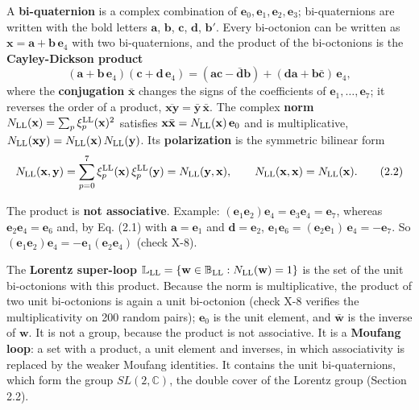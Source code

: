 \documentclass[
  10pt,
]{article}
\begin{document}
A \textbf{bi-quaternion} is a complex combination of
\(\mathbf e_0,\mathbf e_1,\mathbf e_2,\mathbf e_3\); bi-quaternions are
written with the bold letters \(\mathbf a\), \(\mathbf b\),
\(\mathbf c\), \(\mathbf d\), \(\mathbf b'\). Every bi-octonion can be
written as \(\mathbf x=\mathbf a+\mathbf b\,\mathbf e_4\) with two
bi-quaternions, and the product of the bi-octonions is the
\textbf{Cayley-Dickson product}
\[(\mathbf a+\mathbf b\,\mathbf e_4)(\mathbf c+\mathbf d\,\mathbf e_4)=(\mathbf a\mathbf c-\bar{\mathbf d}\mathbf b)+(\mathbf d\mathbf a+\mathbf b\bar{\mathbf c})\,\mathbf e_4 , \tag{2.1}\]
where the \textbf{conjugation} \(\bar{\mathbf x}\) changes the signs of
the coefficients of \(\mathbf e_1,\dots,\mathbf e_7\); it reverses the
order of a product,
\(\overline{\mathbf x\mathbf y}=\bar{\mathbf y}\,\bar{\mathbf x}\). The
complex \textbf{norm}
\(N_{\rm LL}(\mathbf x)=\sum_p\xi^{\rm LL}_p(\mathbf x)^2\) satisfies
\(\mathbf x\bar{\mathbf x}=N_{\rm LL}(\mathbf x)\,\mathbf e_0\) and is
multiplicative,
\(N_{\rm LL}(\mathbf x\mathbf y)=N_{\rm LL}(\mathbf x)\,N_{\rm LL}(\mathbf y)\).
Its \textbf{polarization} is the symmetric bilinear form
\[N_{\rm LL}(\mathbf x,\mathbf y)=\sum_{p=0}^7\xi^{\rm LL}_p(\mathbf x)\,\xi^{\rm LL}_p(\mathbf y)=N_{\rm LL}(\mathbf y,\mathbf x),\qquad N_{\rm LL}(\mathbf x,\mathbf x)=N_{\rm LL}(\mathbf x). \tag{2.2}\]

The product is \textbf{not associative}. Example:
\((\mathbf e_1\mathbf e_2)\mathbf e_4=\mathbf e_3\mathbf e_4=\mathbf e_7\),
whereas \(\mathbf e_2\mathbf e_4=\mathbf e_6\) and, by Eq. (2.1) with
\(\mathbf a=\mathbf e_1\) and \(\mathbf d=\mathbf e_2\),
\(\mathbf e_1\mathbf e_6=(\mathbf e_2\mathbf e_1)\,\mathbf e_4=-\mathbf e_7\).
So
\((\mathbf e_1\mathbf e_2)\mathbf e_4=-\mathbf e_1(\mathbf e_2\mathbf e_4)\)
(check X-8).

The \textbf{Lorentz super-loop}
\(\mathbb L_{\rm LL}=\{\mathbf w\in\mathbb B_{\rm LL}:N_{\rm LL}(\mathbf w)=1\}\)
is the set of the unit bi-octonions with this product. Because the norm
is multiplicative, the product of two unit bi-octonions is again a unit
bi-octonion (check X-8 verifies the multiplicativity on 200 random
pairs); \(\mathbf e_0\) is the unit element, and \(\bar{\mathbf w}\) is
the inverse of \(\mathbf w\). It is not a group, because the product is
not associative. It is a \textbf{Moufang loop}: a set with a product, a
unit element and inverses, in which associativity is replaced by the
weaker Moufang identities. It contains the unit bi-quaternions, which
form the group \(SL(2,\mathbb C)\), the double cover of the Lorentz
group (Section 2.2).
\end{document}
